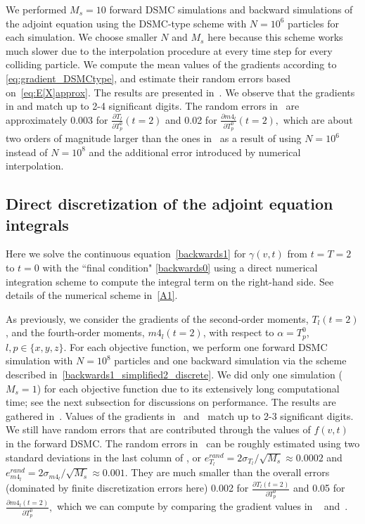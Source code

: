 \documentclass[times,final,nopreprintline]{elsarticle}
\begin{document}
We performed $M_s=10$ forward DSMC simulations and backward simulations of the adjoint equation using the DSMC-type scheme with $N=10^6$ particles for each simulation. We choose smaller $N$ and $M_s$ here because this scheme works much slower due to the interpolation procedure at every time step for every colliding particle. We compute the mean values of the gradients according to \eqref{eq:gradient_DSMCtype}, and estimate their random errors based on~\eqref{eq:E[X]approx}. 
The results are presented in~. We observe that the gradients in  and  match up to 2-4 significant digits. The random errors in~ are approximately 0.003 for $\frac{\partial T_l}{\partial T_p^0}(t=2)$ and 0.02 for $\frac{\partial m4_l}{\partial T_p^0}(t=2),$ which are about two orders of magnitude larger than the ones in~ as a result of using $N=10^6$ instead of $N=10^8$ and the additional error introduced by numerical interpolation.











\subsection{Direct discretization of the adjoint equation integrals} \label{sec:Direct_num}
Here we solve the continuous equation~\eqref{backwards1} for $\gamma(v,t)$ from $t=T=2$ to $t=0$ with the ``final condition" \eqref{backwards0} using a direct numerical integration scheme to compute the integral term on the right-hand side. See details of the numerical scheme in~\ref{A1}.


As previously, we consider the gradients of the second-order moments, $T_l(t=2)$, and the fourth-order moments, $m4_l(t=2)$, with respect to $\alpha=T_p^0$, $l,p\in\{x,y,z\}$.
For each objective function, we perform one forward DSMC simulation with $N=10^8$ particles and one backward simulation via the scheme described in~\eqref{backwards1_simplified2_discrete}. We did only one simulation ($M_s=1$) for each objective function due to its extensively long computational time; see the next subsection for discussions on performance. The results are gathered in~. Values of the gradients in~ and~ match up to 2-3 significant digits. 
We still have random errors that are contributed through the values of $f(v,t)$ in the forward DSMC. The random errors in~ can be roughly estimated using two standard deviations in the last column of , or $e^{rand}_{T_l} = 2 \sigma_{T_l}/\sqrt{M_s} \approx 0.0002$ and $e^{rand}_{m4_l} = 2 \sigma_{m4_l}/\sqrt{M_s} \approx 0.001$. They are much smaller than the overall errors (dominated by finite discretization errors here) 0.002 for $\frac{\partial T_l(t=2)}{\partial T_p^0}$  and 0.05 for $\frac{\partial m4_l(t=2)}{\partial T_p^0},$
which we can compute by comparing the gradient values in ~ and~.
\end{document}
